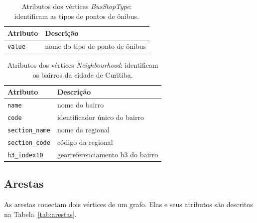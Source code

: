 \begin{table}[htb]
    \caption{Atributos dos vértices \emph{BusStopType}: identificam as tipos de pontos de ônibus.}
    \label{tab:vertice_busstop_type}
    \centering
    \footnotesize
    \begin{tabular}{p{2.5cm}p{6.5cm}}
        \hline
        Atributo & Descrição\\
        \hline
        \texttt{value} & nome do tipo de ponto de ônibus \\
        \hline  
    \end{tabular}
\end{table}

\begin{table}[htb]
    \caption{Atributos dos vértices \emph{Neighbourhood}: identificam os bairros da cidade de Curitiba.}
    \label{tab:vertice_neighbourhood}
    \centering
    \footnotesize
    \begin{tabular}{p{2.5cm}p{2.5cm}}
        \hline
        Atributo & Descrição\\
        \hline
        \texttt{name} & nome do bairro \\
        \texttt{code} & identificador único do bairro \\
        \texttt{section\_name} & nome da regional \\
        \texttt{section\_code} & código da regional \\
        \texttt{h3\_index10} & georreferenciamento h3 do bairro \\
        \hline  
    \end{tabular}
\end{table}


\subsection{Arestas}

As arestas conectam dois vértices de um grafo. Elas e seus atributos são descritos na Tabela~\ref{tab:arestas}.

